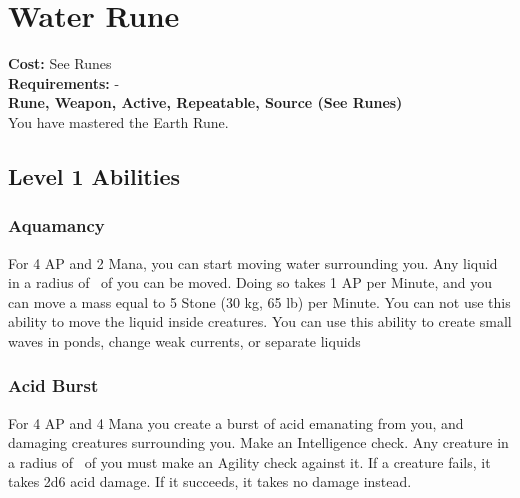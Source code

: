 \twocolumn
\section{Water Rune}\label{rune:water}
\textbf{Cost:} See Runes\\
\textbf{Requirements:} -\\
\textbf{Rune, Weapon, Active, Repeatable, Source (See Runes)}\\
You have mastered the Earth Rune.

\subsection{Level 1 Abilities}

\subsubsection{Aquamancy}
For 4 AP and 2 Mana, you can start moving water surrounding you.
Any liquid in a radius of~ of you can be moved.
Doing so takes 1 AP per Minute, and you can move a mass equal to 5 Stone (30 kg, 65 lb) per Minute.
You can not use this ability to move the liquid inside creatures.
You can use this ability to create small waves in ponds, change weak currents, or separate liquids

\subsubsection{Acid Burst}
For 4 AP and 4 Mana you create a burst of acid emanating from you, and damaging creatures surrounding you.
Make an Intelligence check.
Any creature in a radius of~ of you must make an Agility check against it.
If a creature fails, it takes 2d6 acid damage.
If it succeeds, it takes no damage instead.